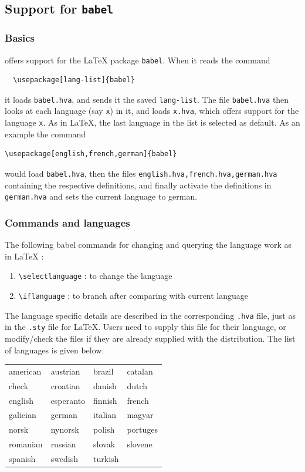 \subsection{Support for \texttt{babel}}
\subsubsection{Basics}
\hevea{} offers support for the \LaTeX{} package {\tt babel}. When it reads the command
\begin{verbatim}
  \usepackage[lang-list]{babel}
\end{verbatim}
it loads {\tt babel.hva}, and sends it the saved {\tt lang-list}. The
file {\tt babel.hva} then looks at each language (say {\tt{}x}) in it, and loads {\tt x.hva}, which offers support for the language {\tt x}. As in \LaTeX, the last language in the list is selected as default. As an example the command
\begin{verbatim}
\usepackage[english,french,german]{babel}
\end{verbatim}
would load {\tt babel.hva}, then the files {\tt english.hva,french.hva,german.hva} containing the respective definitions, and finally activate the definitions in {\tt german.hva} and sets the current language to german.

\subsubsection{Commands and languages}
The following babel commands for changing and querying the language work as in \LaTeX{} :
\begin{enumerate}
\item {\verb+\selectlanguage+ : to change the language}
\item {\verb+\iflanguage+ : to branch after comparing with current language}
\end{enumerate}  

The language specific details are described in the corresponding
\verb+.hva+ file, just as in the \verb+.sty+ file for \LaTeX. Users
need to supply this file for their language, or modify/check the files
if they are already supplied with the distribution. The list of
languages is given below.

\begin{center}
\begin{tabular}{|l|l|l|l|}
\hline
american & austrian & brazil & catalan \\
check & croatian & danish & dutch \\
english & esperanto & finnish & french \\
galician & german & italian & magyar \\
norsk & nynorsk & polish & portuges \\
romanian & russian & slovak & slovene \\
spanish & swedish & turkish & \\
\hline
\end{tabular}
\end{center}

